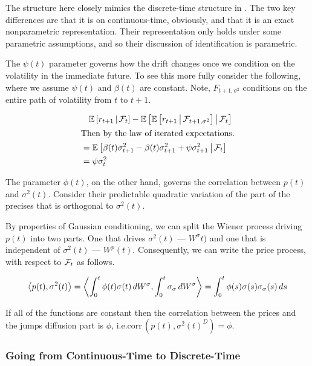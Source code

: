 \documentclass[11pt, letterpaper, twoside, final]{article}
\begin{document}
The structure here closely mimics the discrete-time structure in \textcite{khrapov2016affine}.
The two key differences are that it is on continuous-time, obviously, and that it is an exact nonparametric
representation.
Their representation only holds under some parametric assumptions, and so their discussion of identification is
parametric.


The $\psi(t)$ parameter governs how the drift changes once we condition on the volatility in the immediate
future.
To see this more fully consider the following, where we assume $\psi(t)$ and $\beta(t)$ are constant.
Note, $F_{t+1, \sigma^2}$ conditions on the entire path of volatility from $t$ to $t+1$.


\begin{align}
    &\phantom{=} \E\left[r_{t+1} \mvert \F_{t}\right]  - \E\left[\E\left[r_{t+1} \mvert \F_{t+1, \sigma^2} \right]
      \mvert \F_t \right]  \\
      \intertext{Then by the law of iterated expectations.}
    &=  \E\left[\beta(t) \sigma^2_{t+1} - \beta(t) \sigma^2_{t+1} + \psi \sigma^2_{t+1}  \mvert \F_t \right] \\
    &= \psi \sigma^2_t
\end{align}

The parameter $\phi(t)$, on the other hand, governs the correlation between $p(t)$ and $\sigma^2(t)$.
Consider their predictable quadratic variation of the part of the precises that is orthogonal to $\sigma^2(t)$.

By properties of Gaussian conditioning, we can split the Wiener process driving $p(t)$ into two parts.
One that drives $\sigma^2(t)$ --- $W^{\sigma}t)$ and one that is independent of $\sigma^2(t)$ --- $W^p(t)$.
Consequently, we can write the price process, with respect to $\F_t$ as follows.

\begin{equation}
    \predQV*{p(t), \sigma^2(t)}  
    = \predQV*{\int^t_0 \phi(t) \sigma(t) \dif W^{\sigma}, \int^t_0 \sigma_{\sigma} \dif W^{\sigma}} 
    = \int^t_0 \phi(s) \sigma(s) \sigma_{\sigma}(s) \dif s
\end{equation}

If all of the functions are  constant then the correlation between the prices and the jumps diffusion part is
$\phi$, i.e.\@  $\mathrm{corr}\,(p(t), {\sigma^2(t)}^D) = \phi$.

\subsubsection{Going from Continuous-Time to Discrete-Time}\label{sec:discrete_time_to_cont_time}
\end{document}
